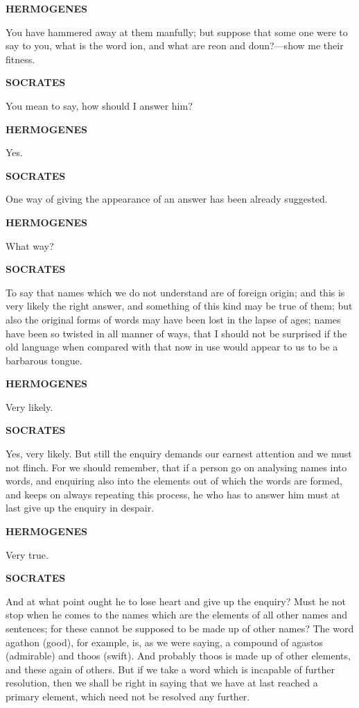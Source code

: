 \documentclass[11pt,letter]{article}
\begin{document}
\par \textbf{HERMOGENES}
\par   You have hammered away at them manfully; but suppose that some one were to say to you, what is the word ion, and what are reon and doun?—show me their fitness.

\par \textbf{SOCRATES}
\par   You mean to say, how should I answer him?

\par \textbf{HERMOGENES}
\par   Yes.

\par \textbf{SOCRATES}
\par   One way of giving the appearance of an answer has been already suggested.

\par \textbf{HERMOGENES}
\par   What way?

\par \textbf{SOCRATES}
\par   To say that names which we do not understand are of foreign origin; and this is very likely the right answer, and something of this kind may be true of them; but also the original forms of words may have been lost in the lapse of ages; names have been so twisted in all manner of ways, that I should not be surprised if the old language when compared with that now in use would appear to us to be a barbarous tongue.

\par \textbf{HERMOGENES}
\par   Very likely.

\par \textbf{SOCRATES}
\par   Yes, very likely. But still the enquiry demands our earnest attention and we must not flinch. For we should remember, that if a person go on analysing names into words, and enquiring also into the elements out of which the words are formed, and keeps on always repeating this process, he who has to answer him must at last give up the enquiry in despair.

\par \textbf{HERMOGENES}
\par   Very true.

\par \textbf{SOCRATES}
\par   And at what point ought he to lose heart and give up the enquiry? Must he not stop when he comes to the names which are the elements of all other names and sentences; for these cannot be supposed to be made up of other names? The word agathon (good), for example, is, as we were saying, a compound of agastos (admirable) and thoos (swift). And probably thoos is made up of other elements, and these again of others. But if we take a word which is incapable of further resolution, then we shall be right in saying that we have at last reached a primary element, which need not be resolved any further.
\end{document}
